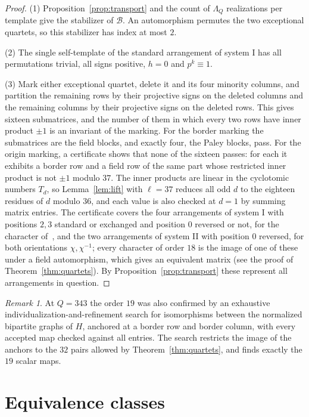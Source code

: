 \documentclass[11pt]{article}
\theoremstyle{plain}
\theoremstyle{definition}
\theoremstyle{remark}
\newtheorem{remark}[theorem]{Remark}
\begin{document}
\begin{proof}
(1) Proposition~\ref{prop:transport} and the count of $\Lambda_Q$ realizations per
template give the stabilizer of $\mathcal B$. An automorphism permutes the
two exceptional quartets, so this stabilizer has index at most $2$.

(2) The single self-template of the standard arrangement of system I has all
permutations trivial, all signs positive, $h=0$ and $p^k\equiv1$.

(3) Mark either exceptional quartet, delete it and its four minority columns,
and partition the remaining rows by their projective signs on the deleted
columns and the remaining columns by their projective signs on the deleted
rows. This gives sixteen submatrices, and the number of them in which every
two rows have inner product $\pm1$ is an invariant of the marking. For the
border marking the submatrices are the field blocks, and exactly four, the
Paley blocks, pass. For the origin marking, a certificate shows that none of
the sixteen passes: for each it exhibits a border row and a field row of the
same part whose restricted inner product is not $\pm1$ modulo $37$. The
inner products are linear in the cyclotomic numbers $T_d$, so
Lemma~\ref{lem:lift} with $\ell=37$ reduces all odd $d$ to the eighteen
residues of $d$ modulo $36$, and each value is also checked at $d=1$ by
summing matrix entries. The certificate covers the four arrangements of
system I with positions $2,3$ standard or exchanged and position $0$
reversed or not, for the character of~\cite{Kline18}, and the two
arrangements of system II with position $0$ reversed, for both orientations
$\chi,\chi^{-1}$; every character of order $18$ is the image of one of these
under a field automorphism, which gives an equivalent matrix (see the proof of Theorem~\ref{thm:quartets}). By
Proposition~\ref{prop:transport} these represent all arrangements in
question.
\end{proof}

\begin{remark}
At $Q=343$ the order $19$ was also confirmed by an exhaustive
individualization-and-refinement search for isomorphisms between the
normalized bipartite graphs of $H$, anchored at a border row and border
column, with every accepted map checked against all entries. The search
restricts the image of the anchors to the $32$ pairs allowed by
Theorem~\ref{thm:quartets}, and finds exactly the $19$ scalar maps.
\end{remark}

\section{Equivalence classes}\label{sec:classes}
\end{document}
